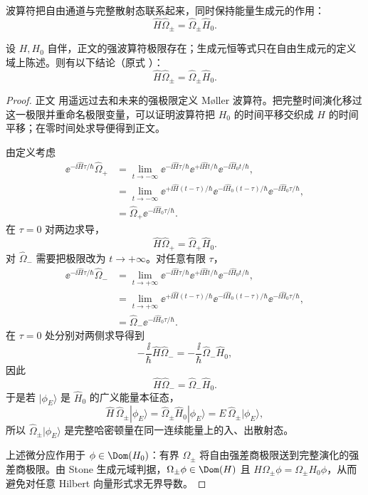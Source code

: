 波算符把自由通道与完整散射态联系起来，同时保持能量生成元的作用：
\begin{equation}
 \boxed{\hat H\hat\Omega_\pm=\hat\Omega_\pm\hat H_0.}
 \label{eq:moller-intertwining-r68}
\end{equation}

\begin{proposition}[波算符的时间演化交织]
设 $H,H_0$ 自伴，正文的强波算符极限存在；生成元恒等式只在自由生成元的定义域上陈述。则有以下结论（原式 ）：
\begin{equation*}
 \boxed{\hat H\hat\Omega_\pm=\hat\Omega_\pm\hat H_0.}
\end{equation*}
\end{proposition}
\begin{proof}
正文 用遥远过去和未来的强极限定义 Møller 波算符。把完整时间演化移过这一极限并重命名极限变量，可以证明波算符把 $H_0$ 的时间平移交织成 $H$ 的时间平移；在零时间处求导便得到正文。



由定义考虑
\begin{align*}
 \ee^{-\ii\hat H\tau/\hbar}\hat\Omega_+
 &=
 \lim_{t\to-\infty}
 \ee^{-\ii\hat H\tau/\hbar}
 \ee^{+\ii\hat Ht/\hbar}
 \ee^{-\ii\hat H_0t/\hbar},\\
 &=
 \lim_{t\to-\infty}
 \ee^{+\ii\hat H(t-\tau)/\hbar}
 \ee^{-\ii\hat H_0(t-\tau)/\hbar}
 \ee^{-\ii\hat H_0\tau/\hbar},\\
 &=\hat\Omega_+\ee^{-\ii\hat H_0\tau/\hbar}.
\end{align*}
在 $\tau=0$ 对两边求导，
\begin{equation*}
 {
 \hat H\hat\Omega_+
 =\hat\Omega_+\hat H_0.}
 \end{equation*}
对 $\hat\Omega_-$ 需要把极限改为 $t\to+\infty$。对任意有限 $\tau$，
\begin{align*}
 \ee^{-\ii\hat H\tau/\hbar}\hat\Omega_-
 &=\lim_{t\to+\infty}
 \ee^{-\ii\hat H\tau/\hbar}
 \ee^{+\ii\hat Ht/\hbar}
 \ee^{-\ii\hat H_0t/\hbar},\\
 &=\lim_{t\to+\infty}
 \ee^{+\ii\hat H(t-\tau)/\hbar}
 \ee^{-\ii\hat H_0(t-\tau)/\hbar}
 \ee^{-\ii\hat H_0\tau/\hbar},\\
 &=\hat\Omega_-\ee^{-\ii\hat H_0\tau/\hbar}.
\end{align*}
在 $\tau=0$ 处分别对两侧求导得到
\[
 -\frac{\ii}{\hbar}\hat H\hat\Omega_-
 =-\frac{\ii}{\hbar}\hat\Omega_-\hat H_0,
\]
因此
\[
 \hat H\hat\Omega_-=\hat\Omega_-\hat H_0.
\]
于是若 $|\phi_E\rangle$ 是 $\hat H_0$ 的广义能量本征态，
\[
 \hat H\,\hat\Omega_\pm|\phi_E\rangle
 =\hat\Omega_\pm\hat H_0|\phi_E\rangle
 =E\,\hat\Omega_\pm|\phi_E\rangle,
\]
所以 $\hat\Omega_\pm|\phi_E\rangle$ 是完整哈密顿量在同一连续能量上的入、出散射态。

上述微分应作用于 $\phi\in\Dom(H_0)$：有界 $\Omega_\pm$ 将自由强差商极限送到完整演化的强差商极限。由 Stone 生成元域判据，$\Omega_\pm\phi\in\Dom(H)$ 且 $H\Omega_\pm\phi=\Omega_\pm H_0\phi$，从而避免对任意 Hilbert 向量形式求无界导数。
\end{proof}

